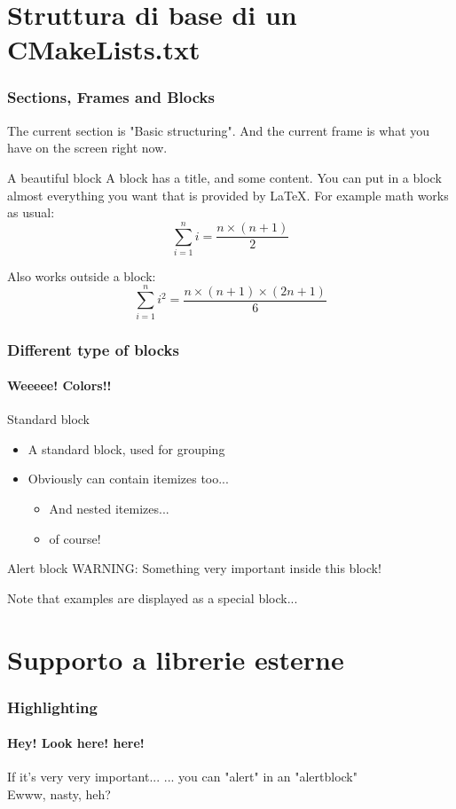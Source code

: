 \documentclass[12pt]{beamer}
\begin{document}
\section{Struttura di base di un CMakeLists.txt}
\begin{frame}
  \frametitle{Sections, Frames and Blocks}
  
  The current section is "Basic structuring". And the current frame
  is what you have on the screen right now.

  \begin{block}{A beautiful block}
  A block has a title, and some content. You can put in a block
  almost everything you want that is provided by LaTeX. For example
  math works as usual:
    \begin{equation}
    \sum_{i=1}^n i = \frac{n \times (n+1)}{2}
    \end{equation}
  \end{block}

  Also works outside a block:
  \begin{equation}
  \sum_{i=1}^n i^2 = \frac{n \times (n+1) \times (2n+1)}{6}
  \end{equation}
\end{frame}

\begin{frame}
  \frametitle{Different type of blocks}
  \framesubtitle{Weeeee! Colors!!}
  \begin{block}{Standard block}
  \begin{itemize}
    \item A standard block, used for grouping
    \item Obviously can contain itemizes too...
    \begin{itemize}
      \item And nested itemizes...
      \item of course!
    \end{itemize}
  \end{itemize}
  \end{block}
  \begin{alertblock}{Alert block}
  WARNING: Something very important inside this block!
  \end{alertblock}
  \begin{example}
  Note that examples are displayed as a special block...
  \end{example}
\end{frame}

\section{Supporto a librerie esterne}
\begin{frame}
  \frametitle{Highlighting}
  \framesubtitle{Hey! Look here! here!}


  \begin{alertblock}{If it's very very important...}
  \alert{... you can "alert" in an "alertblock"}\\
  Ewww, nasty, heh?
  \end{alertblock}
\end{frame}
\end{document}
